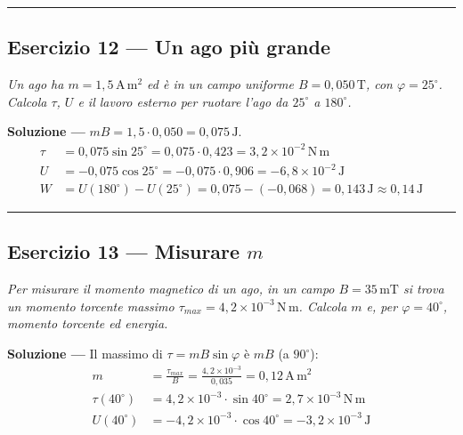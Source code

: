 \documentclass[11pt,a4paper]{scrartcl}
\newenvironment{soluzione}{\par\noindent\textbf{Soluzione ---} }{\par}
\newcommand{\un}[1]{\,\mathrm{#1}}
\begin{document}
\bigskip\hrule\bigskip

\subsection*{Esercizio 12 --- Un ago più grande}
\vspace{2mm}

\begin{esercizio}
\emph{Un ago ha $m=1{,}5\un{A\,m^2}$ ed è in un campo uniforme $B=0{,}050\un{T}$, con $\varphi=25^\circ$. Calcola $\tau$, $U$ e il lavoro esterno per ruotare l'ago da $25^\circ$ a $180^\circ$.}
\end{esercizio}

\begin{soluzione}
$mB=1{,}5\cdot0{,}050=0{,}075\un{J}$.
\begin{align*}
  \tau&=0{,}075\sin25^\circ=0{,}075\cdot0{,}423=3{,}2\times10^{-2}\un{N\,m}\\
  U&=-0{,}075\cos25^\circ=-0{,}075\cdot0{,}906=-6{,}8\times10^{-2}\un{J}\\
  W&=U(180^\circ)-U(25^\circ)=0{,}075-(-0{,}068)=0{,}143\un{J}\approx0{,}14\un{J}
\end{align*}
\end{soluzione}

\bigskip\hrule\bigskip

\subsection*{Esercizio 13 --- Misurare $m$}
\vspace{2mm}

\begin{esercizio}
\emph{Per misurare il momento magnetico di un ago, in un campo $B=35\un{mT}$ si trova un momento torcente massimo $\tau_{max}=4{,}2\times10^{-3}\un{N\,m}$. Calcola $m$ e, per $\varphi=40^\circ$, momento torcente ed energia.}
\end{esercizio}

\begin{soluzione}
Il massimo di $\tau=mB\sin\varphi$ è $mB$ (a $90^\circ$):
\begin{align*}
  m&=\frac{\tau_{max}}{B}=\frac{4{,}2\times10^{-3}}{0{,}035}=0{,}12\un{A\,m^2}\\
  \tau(40^\circ)&=4{,}2\times10^{-3}\cdot\sin40^\circ=2{,}7\times10^{-3}\un{N\,m}\\
  U(40^\circ)&=-4{,}2\times10^{-3}\cdot\cos40^\circ=-3{,}2\times10^{-3}\un{J}
\end{align*}
\end{soluzione}
\end{document}
